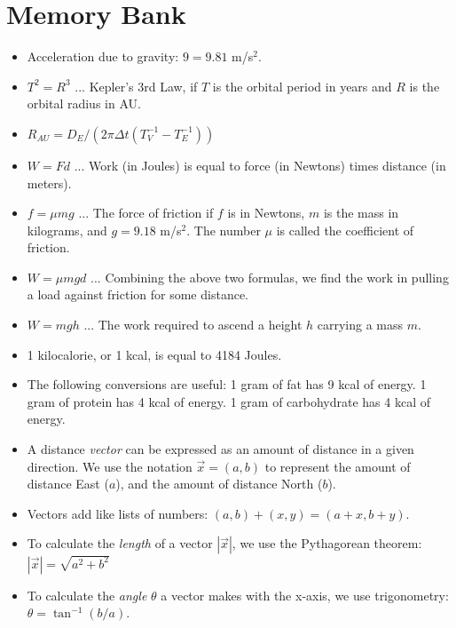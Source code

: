 \documentclass[10pt]{article}
\begin{document}
\maketitle

\section{Memory Bank}

\begin{itemize}
\item Acceleration due to gravity: $9 = 9.81$ m/s$^2$.
\item $T^2 = R^3$ ... Kepler's 3rd Law, if $T$ is the orbital period in years and $R$ is the orbital radius in AU.
\item $R_{AU} = D_E/\left(2\pi\Delta t (T_V^{-1} - T_E^{-1})\right)$
\item $W = F d$ ... Work (in Joules) is equal to force (in Newtons) times distance (in meters).
\item $f = \mu m g$ ... The force of friction if $f$ is in Newtons, $m$ is the mass in kilograms, and $g = 9.18$ m/s$^2$.  The number $\mu$ is called the coefficient of friction.
\item $W = \mu m g d$ ... Combining the above two formulas, we find the work in pulling a load against friction for some distance.
\item $W = mgh$ ... The work required to ascend a height $h$ carrying a mass $m$.
\item 1 kilocalorie, or 1 kcal, is equal to 4184 Joules.
\item The following conversions are useful: 1 gram of fat has 9 kcal of energy.  1 gram of protein has 4 kcal of energy.  1 gram of carbohydrate has 4 kcal of energy.
\item A distance \textit{vector} can be expressed as an amount of distance in a given direction.  We use the notation $\vec{x} = (a,b)$ to represent the amount of distance East ($a$), and the amount of distance North ($b$).
\item Vectors add like lists of numbers: $(a,b) + (x,y) = (a+x,b+y)$.
\item To calculate the \textit{length} of a vector $|\vec{x}|$, we use the Pythagorean theorem: $|\vec{x}| = \sqrt{a^2+b^2}$
\item To calculate the \textit{angle} $\theta$ a vector makes with the x-axis, we use trigonometry: $\theta = \tan^{-1}(b/a)$.
\end{itemize}
\end{document}

